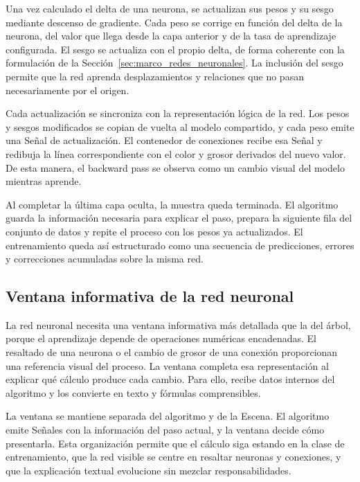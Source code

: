 Una vez calculado el delta de una neurona, se actualizan sus pesos y su sesgo mediante descenso de gradiente.
Cada peso se corrige en función del delta de la neurona, del valor que llega desde la capa anterior y de la tasa de aprendizaje configurada.
El sesgo se actualiza con el propio delta, de forma coherente con la formulación de la Sección~\ref{sec:marco_redes_neuronales}.
La inclusión del sesgo permite que la red aprenda desplazamientos y relaciones que no pasan necesariamente por el origen.

Cada actualización se sincroniza con la representación lógica de la red.
Los pesos y sesgos modificados se copian de vuelta al modelo compartido, y cada peso emite una Señal de actualización.
El contenedor de conexiones recibe esa Señal y redibuja la línea correspondiente con el color y grosor derivados del nuevo valor.
De esta manera, el backward pass se observa como un cambio visual del modelo mientras aprende.

Al completar la última capa oculta, la muestra queda terminada.
El algoritmo guarda la información necesaria para explicar el paso, prepara la siguiente fila del conjunto de datos y repite el proceso con los pesos ya actualizados.
El entrenamiento queda así estructurado como una secuencia de predicciones, errores y correcciones acumuladas sobre la misma red.


\subsection{Ventana informativa de la red neuronal}

La red neuronal necesita una ventana informativa más detallada que la del árbol, porque el aprendizaje depende de operaciones numéricas encadenadas.
El resaltado de una neurona o el cambio de grosor de una conexión proporcionan una referencia visual del proceso.
La ventana completa esa representación al explicar qué cálculo produce cada cambio.
Para ello, recibe datos internos del algoritmo y los convierte en texto y fórmulas comprensibles.

La ventana se mantiene separada del algoritmo y de la \gls{Escena}.
El algoritmo emite Señales con la información del paso actual, y la ventana decide cómo presentarla.
Esta organización permite que el cálculo siga estando en la clase de entrenamiento, que la red visible se centre en resaltar neuronas y conexiones, y que la explicación textual evolucione sin mezclar responsabilidades.

